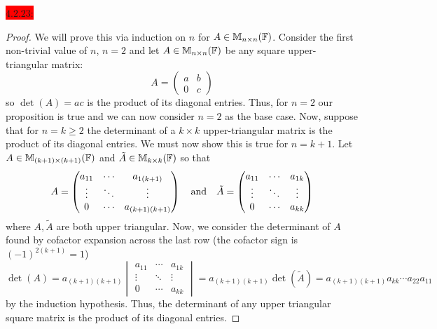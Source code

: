 \documentclass{exam}
\begin{document}
  \colorbox{red}{\underline{$4.2.23$}:}
  \begin{solution}
    \begin{proof}
      We will prove this via induction on $n$ for $A \in \mathbb M_{n \times n}(\mathbb F)$. Consider the first non-trivial value of $n$, $n = 2$ and let $A \in \mathbb M_{n \times n}(\mathbb F)$ be any square upper-triangular matrix: 
      \[
        A = \begin{pmatrix}
          a & b \\
          0 & c
        \end{pmatrix}
      \]
      so $\det(A) = ac$ is the product of its diagonal entries. Thus, for $n = 2$ our proposition is true and we can now consider $n = 2$ as the base case. Now, suppose that for $n = k \geq 2$ the determinant of a $k \times k$ upper-triangular matrix is the product of its diagonal entries. We must now show this is true for $n = k+1$. Let $A \in \mathbb M_{(k+1) \times (k+1)}(\mathbb F)$ and $\tilde{A} \in \mathbb M_{k \times k}(\mathbb F)$ so that 
      \[
        A = \begin{pmatrix}
          a_{11} & \cdots & a_{1(k+1)} \\
          \vdots & \ddots & \vdots \\
          0 & \cdots & a_{(k+1)(k+1)}
        \end{pmatrix}
        \quad\text{and}\quad 
        \tilde{A} = \begin{pmatrix}
          a_{11} & \cdots & a_{1k} \\
          \vdots & \ddots & \vdots \\
          0 & \cdots & a_{kk}
        \end{pmatrix}
      \]
      where $A, \tilde{A}$ are both upper triangular. Now, we consider the determinant of $A$ found by cofactor expansion across the last row (the cofactor sign is $(-1)^{2(k+1)} = 1$) 
      \[
        \det(A) = a_{(k+1)(k+1)}\begin{vmatrix}
          a_{11} & \cdots & a_{1k} \\
          \vdots & \ddots & \vdots \\
          0 & \cdots & a_{kk}
        \end{vmatrix}
        = a_{(k+1)(k+1)}\det(\tilde{A}) = a_{(k+1)(k+1)}a_{kk} \cdots a_{22}a_{11}
      \]
      by the induction hypothesis. Thus, the determinant of any upper triangular square matrix is the product of its diagonal entries.
    \end{proof}
  \end{solution}
\end{document}

